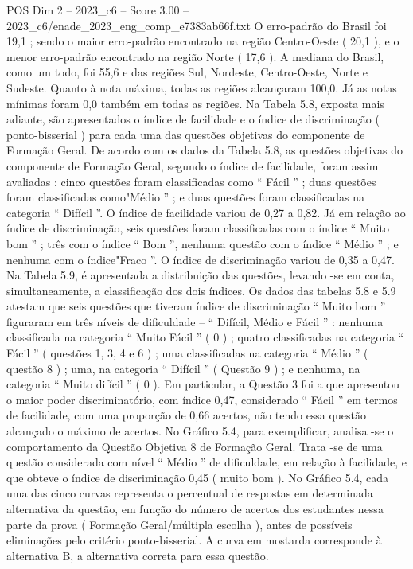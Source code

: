 \begin{textsample}{POS Dim 2 – 2023\_c6 – Score 3.00 – 2023\_c6/enade\_2023\_eng\_comp\_e7383ab66f.txt}
O erro-padrão do Brasil foi 19,1 ; sendo o maior erro-padrão encontrado na região Centro-Oeste ( 20,1 ), e o menor erro-padrão encontrado na região Norte ( 17,6 ).
A mediana do Brasil, como um todo, foi 55,6 e das regiões Sul, Nordeste, Centro-Oeste, Norte e Sudeste.
Quanto à nota máxima, todas as regiões alcançaram 100,0.
Já as notas mínimas foram 0,0 também em todas as regiões.
Na Tabela 5.8, exposta mais adiante, são apresentados o índice de facilidade e o índice de discriminação ( ponto-bisserial ) para cada uma das questões objetivas do componente de Formação Geral.
De acordo com os dados da Tabela 5.8, as questões objetivas do componente de Formação Geral, segundo o índice de facilidade, foram assim avaliadas : cinco questões foram classificadas como “ Fácil ” ; duas questões foram classificadas como"Médio ” ; e duas questões foram classificadas na categoria “ Difícil ”.
O índice de facilidade variou de 0,27 a 0,82.
Já em relação ao índice de discriminação, seis questões foram classificadas com o índice “ Muito bom ” ; três com o índice “ Bom ”, nenhuma questão com o índice “ Médio ” ; e nenhuma com o índice"Fraco ”.
O índice de discriminação variou de 0,35 a 0,47.
Na Tabela 5.9, é apresentada a distribuição das questões, levando -se em conta, simultaneamente, a classificação dos dois índices.
Os dados das tabelas 5.8 e 5.9 atestam que seis questões que tiveram índice de discriminação “ Muito bom ” figuraram em três níveis de dificuldade – “ Difícil, Médio e Fácil ” : nenhuma classificada na categoria “ Muito Fácil ” ( 0 ) ; quatro classificadas na categoria “ Fácil ” ( questões 1, 3, 4 e 6 ) ; uma classificadas na categoria “ Médio ” ( questão 8 ) ; uma, na categoria “ Difícil ” ( Questão 9 ) ; e nenhuma, na categoria “ Muito difícil ” ( 0 ).
Em particular, a Questão 3 foi a que apresentou o maior poder discriminatório, com índice 0,47, considerado “ Fácil ” em termos de facilidade, com uma proporção de 0,66 acertos, não tendo essa questão alcançado o máximo de acertos.
No Gráfico 5.4, para exemplificar, analisa -se o comportamento da Questão Objetiva 8 de Formação Geral.
Trata -se de uma questão considerada com nível “ Médio ” de dificuldade, em relação à facilidade, e que obteve o índice de discriminação 0,45 ( muito bom ).
No Gráfico 5.4, cada uma das cinco curvas representa o percentual de respostas em determinada alternativa da questão, em função do número de acertos dos estudantes nessa parte da prova ( Formação Geral/múltipla escolha ), antes de possíveis eliminações pelo critério ponto-bisserial.
A curva em mostarda corresponde à alternativa B, a alternativa correta para essa questão.

\end{textsample}
